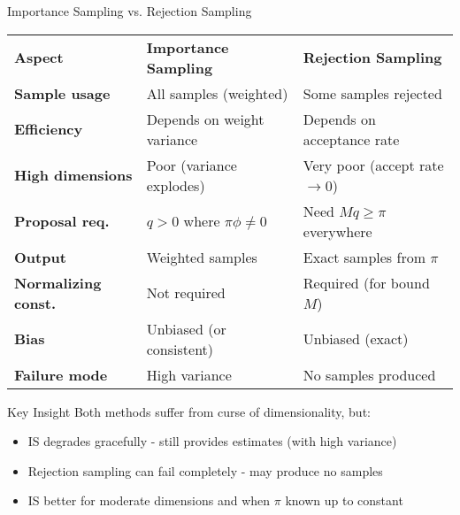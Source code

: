 \begin{frame}{Importance Sampling vs. Rejection Sampling}
	\begin{center}
		\small
		\begin{tabular}{lll}
			\textbf{Aspect}             & \textbf{Importance Sampling}   & \textbf{Rejection Sampling}     \\
			\textbf{Sample usage}       & All samples (weighted)         & Some samples rejected           \\
			\textbf{Efficiency}         & Depends on weight variance     & Depends on acceptance rate      \\
			\textbf{High dimensions}    & Poor (variance explodes)       & Very poor (accept rate $\to 0$) \\
			\textbf{Proposal req.}      & $q > 0$ where $\pi\phi \neq 0$ & Need $Mq \geq \pi$ everywhere   \\
			\textbf{Output}             & Weighted samples               & Exact samples from $\pi$        \\
			\textbf{Normalizing const.} & Not required                   & Required (for bound $M$)        \\
			\textbf{Bias}               & Unbiased (or consistent)       & Unbiased (exact)                \\
			\textbf{Failure mode}       & High variance                  & No samples produced             \\
		\end{tabular}
	\end{center}

	\vspace{0.5cm}
	\begin{block}{Key Insight}
		Both methods suffer from curse of dimensionality, but:
		\begin{itemize}
			\item IS degrades gracefully - still provides estimates (with high variance)
			\item Rejection sampling can fail completely - may produce no samples
			\item IS better for moderate dimensions and when $\pi$ known up to constant
		\end{itemize}
	\end{block}
\end{frame}



